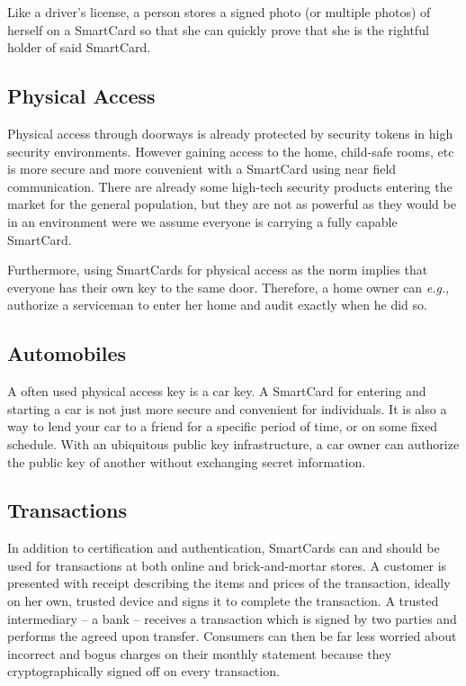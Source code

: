 \documentclass[11pt, twocolumn]{article}
\begin{document}
Like a driver's license, a person stores a signed photo (or multiple photos) of
herself on a SmartCard so that she can quickly prove that she is the rightful
holder of said SmartCard.

\subsection{Physical Access}

Physical access through doorways is already protected by security tokens in high
security environments. However gaining access to the home, child-safe rooms, etc
is more secure and more convenient with a SmartCard using near field
communication. There are already some high-tech security products entering the
market for the general population, but they are not as powerful as they would be
in an environment were we assume everyone is carrying a fully capable SmartCard.

Furthermore, using SmartCards for physical access as the norm implies that
everyone has their own key to the same door. Therefore, a home owner can
\textit{e.g.}, authorize a serviceman to enter her home and audit exactly when
he did so.

\subsection{Automobiles}

A often used physical access key is a car key. A SmartCard for entering and
starting a car is not just more secure and convenient for individuals. It is
also a way to lend your car to a friend for a specific period of time, or on
some fixed schedule. With an ubiquitous public key infrastructure, a car owner
can authorize the public key of another without exchanging secret information.

\subsection{Transactions}

In addition to certification and authentication, SmartCards can and should be
used for transactions at both online and brick-and-mortar stores. A customer is
presented with receipt describing the items and prices of the transaction,
ideally on her own, trusted device and signs it to complete the transaction. A
trusted intermediary -- a bank -- receives a transaction which is signed by two
parties and performs the agreed upon transfer. Consumers can then be far less
worried about incorrect and bogus charges on their monthly statement because
they cryptographically signed off on every transaction.
\end{document}
